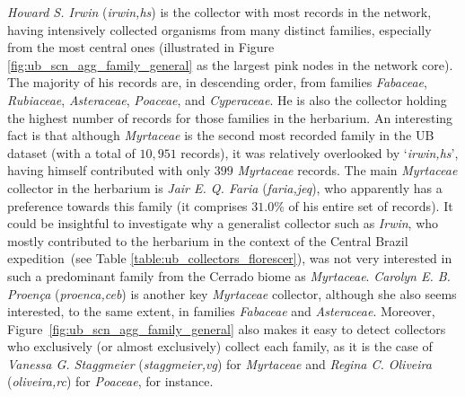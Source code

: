 \textit{Howard S. Irwin} (\textit{irwin,hs}) is the collector with most records in the network, having intensively collected organisms from many distinct families, especially from the most central ones (illustrated in Figure \ref{fig:ub_scn_agg_family_general} as the largest pink nodes in the network core).
The majority of his records are, in descending order, from families \textit{Fabaceae}, \textit{Rubiaceae}, \textit{Asteraceae}, \textit{Poaceae}, and \textit{Cyperaceae}. 
He is also the collector holding the highest number of records for those families in the herbarium.
An interesting fact is that although \textit{Myrtaceae} is the second most recorded family in the UB dataset (with a total of $10,951$ records), it was relatively overlooked by `\textit{irwin,hs}', having himself contributed with only $399$ \textit{Myrtaceae} records. 
The main \textit{Myrtaceae} collector in the herbarium is \textit{Jair E. Q. Faria} (\textit{faria,jeq}), who apparently has a preference towards this family (it comprises $31.0\%$ of his entire set of records). 
It could be insightful to investigate why a generalist collector such as \textit{Irwin}, who mostly contributed to the herbarium in the context of the Central Brazil expedition~(see Table \ref{table:ub_collectors_florescer}), was not very interested in such a predominant family from the Cerrado biome as \textit{Myrtaceae}.
\textit{Carolyn E. B. Proença} (\textit{proenca,ceb}) is another key \textit{Myrtaceae} collector, although she also seems interested, to the same extent, in families \textit{Fabaceae} and \textit{Asteraceae}. 
Moreover, Figure~\ref{fig:ub_scn_agg_family_general} also makes it easy to detect collectors who exclusively (or almost exclusively) collect each family, as it is the case of \textit{Vanessa G. Staggmeier} (\textit{staggmeier,vg}) for \textit{Myrtaceae} and \textit{Regina C. Oliveira} (\textit{oliveira,rc}) for \textit{Poaceae}, for instance.

